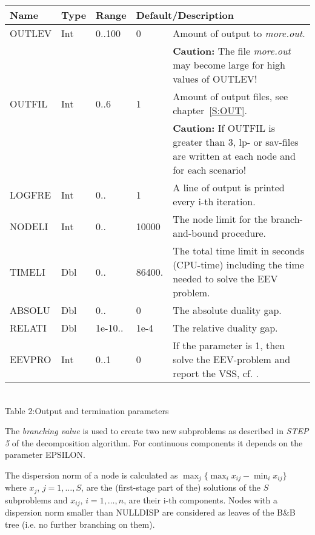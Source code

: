 \documentclass[11pt,draft]{article}
\newcommand{\+}{{\ti{+}}}
\newcommand{\1}{{\ti{1}}}
\begin{document}
\begin{center}
\begin{tabular}{|llllp{6.4cm}|} 
\hline
Name&Type&Range&\multicolumn{2}{l|}{Default/Description}\\ \hline
OUTLEV&Int&0..100&0&Amount of output to {\it more.out}.\\&&&& {\bf Caution:} The file {\it more.out} may become
large for high values of OUTLEV!\medskip\\  
OUTFIL&Int&0..6&1&Amount of output files, see
chapter~\ref{S:OUT}.\\&&&& {\bf Caution:} If OUTFIL is greater than 3, lp- or sav-files are written at each node
and for each scenario! \medskip\\  
LOGFRE&Int&0..&1&A line of output is printed every i-th iteration. \medskip\\
NODELI&Int&0..&10000&The node limit for the branch-and-bound procedure. \medskip\\  
TIMELI&Dbl&0..&86400.&The total time limit in seconds (CPU-time) 
including the time needed to solve the EEV problem. \medskip\\ 
ABSOLU&Dbl&0..&0&The absolute duality gap.\medskip\\ 
RELATI&Dbl&1e-10..&1e-4&The relative duality gap.\\
EEVPRO&Int&0..1&0&If the parameter is 1, then solve the EEV-problem and report the VSS, cf. \cite{bir}.\medskip\\  
\hline
\end{tabular}\\[0.5em]
{Table 2:\quad Output and termination parameters}
\end{center}
%

The {\it branching value} is used to create two new subproblems as described in {\em STEP 5} of the
decomposition algorithm. For continuous components it depends on the parameter EPSILON.

The dispersion norm of a node is calculated as $\max_{j}  \{  \max_{i}
x_{ij} - \min_{i} x_{ij}\}$ where $x_j$, $j=1,\ldots,S$, are the (first-stage part of the) solutions
of the $S$ subproblems and $x_{ij}$, $i=1,\ldots,n$, are their i-th components.
Nodes with a dispersion norm smaller than NULLDISP are considered as leaves of the 
B\&B tree (i.e. no further branching on them).
\end{document}
